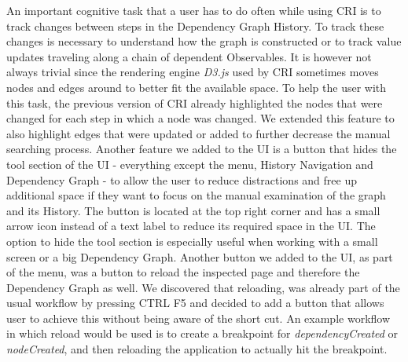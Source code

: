 An important cognitive task that a user has to do often while using CRI is to track changes between steps in the Dependency Graph History. To track these changes is necessary to understand how the graph is constructed or to track value updates traveling along a chain of dependent Observables. It is however not always trivial since the rendering engine \emph{D3.js} \cite{D3JS} used by CRI sometimes moves nodes and edges around to better fit the available space. To help the user with this task, the previous version of CRI already highlighted the nodes that were changed for each step in which a node was changed. We extended this feature to also highlight edges that were updated or added to further decrease the manual searching process. Another feature we added to the UI is a button that hides the tool section of the UI - everything except the menu, History Navigation and Dependency Graph - to allow the user to reduce distractions and free up additional space if they want to focus on the manual examination of the graph and its History. The button is located at the top right corner and has a small arrow icon instead of a text label to reduce its required space in the UI. The option to hide the tool section is especially useful when working with a small screen or a big Dependency Graph. Another button we added to the UI, as part of the menu, was a button to reload the inspected page and therefore the Dependency Graph as well. We discovered that reloading, was already part of the usual workflow by pressing CTRL F5 and decided to add a button that allows user to achieve this without being aware of the short cut. An example workflow in which reload would be used is to create a breakpoint for \emph{dependencyCreated} or \emph{nodeCreated}, and then reloading the application to actually hit the breakpoint.
